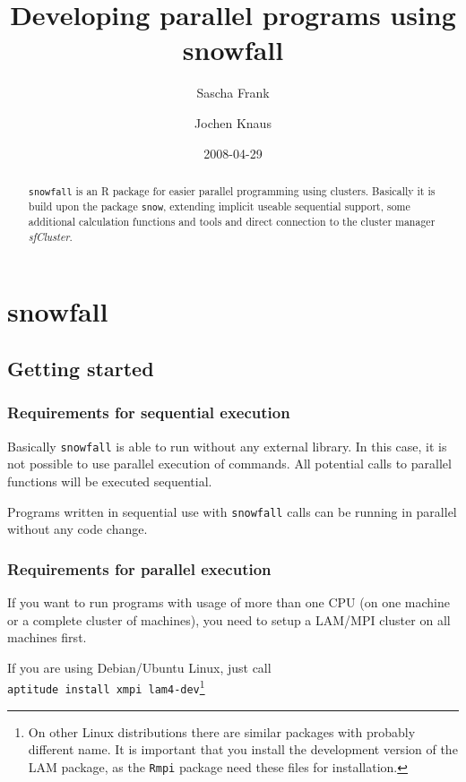 \documentclass[10pt,oneside]{article}
\begin{document}
\pagestyle{empty}

\setlength{\baselineskip}{1.25em}
\setlength{\parskip}{0.5em}
\setlength{\parindent}{0.0em}
\begin{titlepage}
\author{Sascha Frank} 
\title{Developing parallel programs using snowfall}
\author{Jochen Knaus}
\date{2008-04-29}
\maketitle

\begin{abstract}
\texttt{snowfall} is an R package for easier parallel programming
using clusters. Basically it is build upon the package
\texttt{snow}, extending implicit useable sequential support,
some additional calculation functions and tools and direct connection
to the cluster manager \emph{sfCluster}.
\end{abstract}
\end{titlepage}

\tableofcontents
\newpage
\section{snowfall}
\subsection{Getting started}
\subsubsection{Requirements for sequential execution}
Basically \texttt{snowfall} is able to run without any external
library. In this case, it is not possible to use parallel execution
of commands. All potential calls to parallel functions will be
executed sequential.

Programs written in sequential use with \texttt{snowfall} calls
can be running in parallel without any code change.

\subsubsection{Requirements for parallel execution}
If you want to run programs with usage of more than one CPU (on
one machine or a complete cluster of machines), you need to setup
a LAM/MPI cluster on all machines first.

If you are using Debian/Ubuntu Linux, just call\\
\texttt{aptitude install xmpi lam4-dev}\footnote{On other Linux distributions
there are similar packages with probably different name. It is important
that you install the development version of the LAM package, as the
\texttt{Rmpi} package need these files for installation.}
\end{document}

